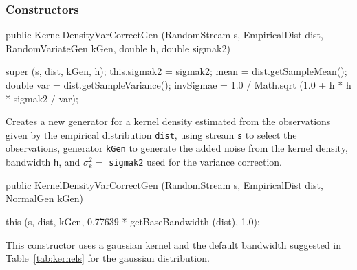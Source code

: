 \subsubsection* {Constructors}

\begin{code}

   public KernelDensityVarCorrectGen (RandomStream s, EmpiricalDist dist,
                                      RandomVariateGen kGen, double h,
                                      double sigmak2)\begin{hide} {
      super (s, dist, kGen, h);
      this.sigmak2 = sigmak2;
      mean = dist.getSampleMean();
      double var = dist.getSampleVariance();
      invSigmae = 1.0 / Math.sqrt (1.0 + h * h * sigmak2 / var);
   }\end{hide}
\end{code}
  \begin{tabb}  Creates a new generator for a kernel density estimated 
    from the observations given by the empirical distribution \texttt{dist},
    using stream \texttt{s} to select the observations,
    generator \texttt{kGen} to generate the added noise from the kernel
    density, bandwidth \texttt{h}, and $\sigma_k^2 =$ \texttt{sigmak2} used for
    the variance correction.
  \end{tabb}
\begin{code}

   public KernelDensityVarCorrectGen (RandomStream s, EmpiricalDist dist,
                                      NormalGen kGen)\begin{hide} {
      this (s, dist, kGen, 0.77639 * getBaseBandwidth (dist), 1.0);
   }\end{hide}
\end{code}
  \begin{tabb}
    This constructor uses a gaussian kernel and the default 
    bandwidth suggested in Table~\ref{tab:kernels} for the gaussian 
    distribution.
  \end{tabb}

\begin{code}\begin{hide}

   public void setBandwidth (double h) {
      if (h < 0)
         throw new IllegalArgumentException ("h < 0");
      bandwidth = h;
      double var = ((EmpiricalDist) dist).getSampleVariance();
      invSigmae = 1.0 / Math.sqrt (1.0 + h * h * sigmak2 / var);
   }

   public double nextDouble() {
      double x = mean + invSigmae * (dist.inverseF (stream.nextDouble())
                  - mean + bandwidth * kernelGen.nextDouble());
      if (positive)
         return Math.abs (x);
      else
         return x;
   }
}\end{hide}
\end{code}
